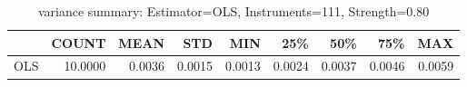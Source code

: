 \begin{table}[ht]
\centering
\caption{variance summary: Estimator=OLS, Instruments=111, Strength=0.80}
\begin{tabular}{lrrrrrrrr}
\toprule
 & COUNT & MEAN & STD & MIN & 25\% & 50\% & 75\% & MAX \\
\midrule
OLS & 10.0000 & 0.0036 & 0.0015 & 0.0013 & 0.0024 & 0.0037 & 0.0046 & 0.0059 \\
\bottomrule
\end{tabular}
\end{table}
